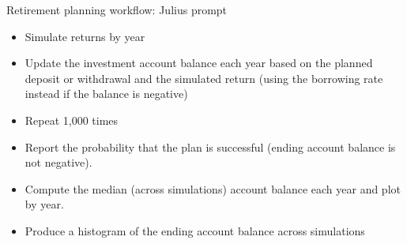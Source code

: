 \documentclass[10pt]{beamer}
\begin{document}
\begin{frame}{Retirement planning workflow: Julius prompt}
\begin{itemize}
\item Simulate returns by year 
\item Update the investment account balance each year based on the planned deposit or withdrawal and the simulated return (using the borrowing rate instead if the balance is negative)
\item Repeat 1,000 times
\item Report the probability that the plan is successful (ending account balance is not negative).
\item Compute the median (across simulations) account balance each year and plot by year.
\item Produce a histogram of the ending account balance across simulations 
\end{itemize}
\end{frame}
\end{document}
